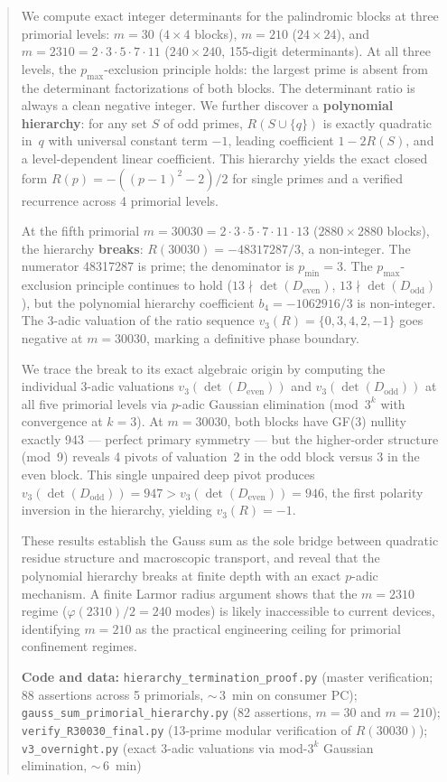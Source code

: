 \documentclass[11pt,letterpaper]{article}
\theoremstyle{definition}
\begin{document}
\begin{abstract}
We compute exact integer determinants for the palindromic blocks at three primorial levels: $m = 30$ ($4 \times 4$ blocks), $m = 210$ ($24 \times 24$), and $m = 2310 = 2 \cdot 3 \cdot 5 \cdot 7 \cdot 11$ ($240 \times 240$, 155-digit determinants). At all three levels, the $p_{\text{max}}$-exclusion principle holds: the largest prime is absent from the determinant factorizations of both blocks. The determinant ratio is always a clean negative integer. We further discover a \textbf{polynomial hierarchy}: for any set $S$ of odd primes, $R(S \cup \{q\})$ is exactly quadratic in~$q$ with universal constant term $-1$, leading coefficient $1 - 2R(S)$, and a level-dependent linear coefficient. This hierarchy yields the exact closed form $R(p) = -((p-1)^2-2)/2$ for single primes and a verified recurrence across 4 primorial levels.

At the fifth primorial $m = 30030 = 2 \cdot 3 \cdot 5 \cdot 7 \cdot 11 \cdot 13$ ($2880 \times 2880$ blocks), the hierarchy \textbf{breaks}: $R(30030) = -48317287/3$, a non-integer. The numerator 48317287 is prime; the denominator is $p_{\text{min}} = 3$. The $p_{\text{max}}$-exclusion principle continues to hold ($13 \nmid \det(D_{\text{even}})$, $13 \nmid \det(D_{\text{odd}})$), but the polynomial hierarchy coefficient $b_4 = -1062916/3$ is non-integer. The 3-adic valuation of the ratio sequence $v_3(R) = \{0, 3, 4, 2, -1\}$ goes negative at $m = 30030$, marking a definitive phase boundary.

We trace the break to its exact algebraic origin by computing the individual 3-adic valuations $v_3(\det(D_{\text{even}}))$ and $v_3(\det(D_{\text{odd}}))$ at all five primorial levels via $p$-adic Gaussian elimination (mod~$3^k$ with convergence at $k = 3$). At $m = 30030$, both blocks have GF(3) nullity exactly 943 --- perfect primary symmetry --- but the higher-order structure (mod~9) reveals 4 pivots of valuation~2 in the odd block versus 3 in the even block. This single unpaired deep pivot produces $v_3(\det(D_{\text{odd}})) = 947 > v_3(\det(D_{\text{even}})) = 946$, the first polarity inversion in the hierarchy, yielding $v_3(R) = -1$.

These results establish the Gauss sum as the sole bridge between quadratic residue structure and macroscopic transport, and reveal that the polynomial hierarchy breaks at finite depth with an exact $p$-adic mechanism. A finite Larmor radius argument shows that the $m = 2310$ regime ($\varphi(2310)/2 = 240$ modes) is likely inaccessible to current devices, identifying $m = 210$ as the practical engineering ceiling for primorial confinement regimes.

\medskip

\textbf{Code and data:} \texttt{hierarchy\_termination\_proof.py} (master verification; 88 assertions across 5 primorials, ${\sim}\,3$~min on consumer PC); \texttt{gauss\_sum\_primorial\_hierarchy.py} (82 assertions, $m = 30$ and $m = 210$); \texttt{verify\_R30030\_final.py} (13-prime modular verification of $R(30030)$); \texttt{v3\_overnight.py} (exact 3-adic valuations via mod-$3^k$ Gaussian elimination, ${\sim}\,6$~min)
\end{abstract}
\end{document}
